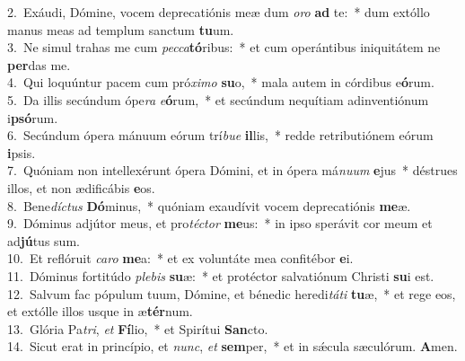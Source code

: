 {2.~}Exáudi, Dómine, vocem deprecatiónis meæ dum \textit{o}\textit{ro} \textbf{ad} te:~* dum extóllo manus meas ad templum sanctum \textbf{tu}um.\\
{3.~}Ne simul trahas me cum \textit{pec}\textit{ca}\textbf{tó}ribus:~* et cum operántibus iniquitátem ne \textbf{per}das me.\\
{4.~}Qui loquúntur pacem cum pró\textit{xi}\textit{mo} \textbf{su}o,~* mala autem in córdibus e\textbf{ó}rum.\\
{5.~}Da illis secúndum ópe\textit{ra} \textit{e}\textbf{ó}rum,~* et secúndum nequítiam adinventiónum i\textbf{psó}rum.\\
{6.~}Secúndum ópera mánuum eórum trí\textit{bu}\textit{e} \textbf{il}lis,~* redde retributiónem eórum \textbf{i}psis.\\
{7.~}Quóniam non intellexérunt ópera Dómini, et in ópera má\textit{nu}\textit{um} \textbf{e}jus~* déstrues illos, et non ædificábis \textbf{e}os.\\
{8.~}Bene\textit{dí}\textit{ctus} \textbf{Dó}minus,~* quóniam exaudívit vocem deprecatiónis \textbf{me}æ.\\
{9.~}Dóminus adjútor meus, et pro\textit{té}\textit{ctor} \textbf{me}us:~* in ipso sperávit cor meum et ad\textbf{jú}tus sum.\\
{10.~}Et reflóruit \textit{ca}\textit{ro} \textbf{me}a:~* et ex voluntáte mea confitébor \textbf{e}i.\\
{11.~}Dóminus fortitúdo \textit{ple}\textit{bis} \textbf{su}æ:~* et protéctor salvatiónum Christi \textbf{su}i est.\\
{12.~}Salvum fac pópulum tuum, Dómine, et bénedic heredi\textit{tá}\textit{ti} \textbf{tu}æ,~* et rege eos, et extólle illos usque in æ\textbf{tér}num.\\
{13.~}Glória Pa\textit{tri}, \textit{et} \textbf{Fí}lio,~* et Spirítui \textbf{San}cto.\\
{14.~}Sicut erat in princípio, et \textit{nunc}, \textit{et} \textbf{sem}per,~* et in sǽcula sæculórum. \textbf{A}men.\\
